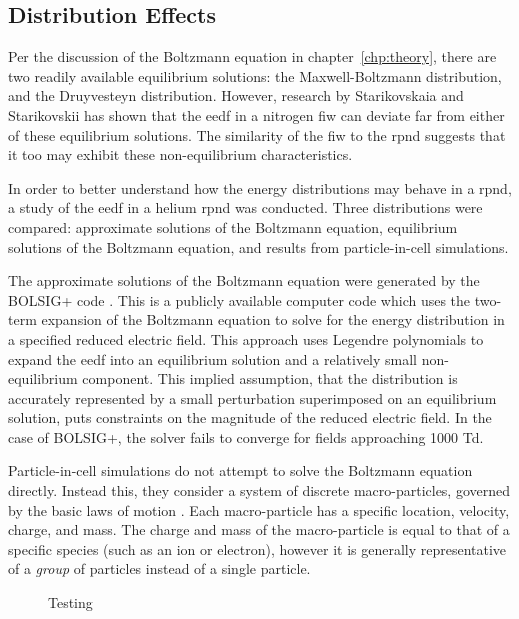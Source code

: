 \subsection{Distribution Effects}

Per the discussion of the Boltzmann equation in chapter~\ref{chp:theory}, there
are two readily available equilibrium solutions: the Maxwell-Boltzmann
distribution, and the Druyvesteyn distribution. However, research by
Starikovskaia and Starikovskii \cite{Starikovskaia2001} has shown that the
\acs{eedf} in a nitrogen \acs{fiw} can deviate far from either of these
equilibrium solutions. The similarity of the \acs{fiw} to the \acs{rpnd}
suggests that it too may exhibit these non-equilibrium characteristics.

In order to better understand how the energy distributions may behave in a
\acs{rpnd}, a study of the \acs{eedf} in a helium \acs{rpnd} was conducted.
Three distributions were compared: approximate solutions of the Boltzmann
equation, equilibrium solutions of the Boltzmann equation, and results from
particle-in-cell simulations.

The approximate solutions of the Boltzmann equation were generated by the
BOLSIG+ code \cite{Hagelaar2005}. This is a publicly available computer code
which uses the two-term expansion of the Boltzmann equation to solve for the
energy distribution in a specified reduced electric field. This approach uses
Legendre polynomials to expand the \acs{eedf} into an equilibrium solution and a
relatively small non-equilibrium component. This implied assumption, that the
distribution is accurately represented by a small perturbation superimposed on
an equilibrium solution, puts constraints on the magnitude of the reduced
electric field. In the case of BOLSIG+, the solver fails to converge for fields
approaching 1000 Td.

Particle-in-cell simulations do not attempt to solve the Boltzmann equation
directly. Instead this, they consider a system of discrete macro-particles,
governed by the basic laws of motion \cite{Birdsall1991}. Each macro-particle
has a specific location, velocity, charge, and mass. The charge and mass of the
macro-particle is equal to that of a specific species (such as an ion or
electron), however it is generally representative of a \emph{group} of particles
instead of a single particle. 

\begin{figure}
  
  \caption{Testing}
  \label{fig:pic}
\end{figure}

